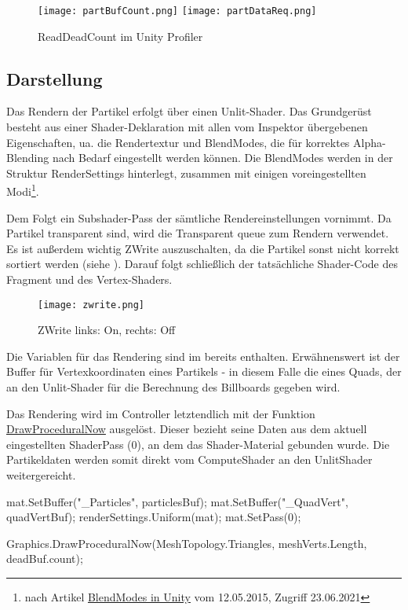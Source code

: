 \begin{figure}[H]
\centering
\texttt{[image: partBufCount.png]}
\texttt{[image: partDataReq.png]}
\caption{ReadDeadCount im Unity Profiler}
\end{figure}
    

\subsection{Darstellung}

Das Rendern der Partikel erfolgt über einen Unlit-Shader. Das Grundgerüst besteht aus einer Shader-Deklaration mit allen vom Inspektor übergebenen Eigenschaften, ua. die Rendertextur und BlendModes, die für korrektes Alpha-Blending nach Bedarf eingestellt werden können. Die BlendModes werden in der Struktur RenderSettings hinterlegt, zusammen mit einigen voreingestellten Modi\footnote{nach Artikel \href{https://elringus.me/blend-modes-in-unity}{BlendModes in Unity} vom 12.05.2015, Zugriff 23.06.2021}.

Dem Folgt ein Subshader-Pass der sämtliche Rendereinstellungen vornimmt. Da Partikel transparent sind, wird die Transparent queue zum Rendern verwendet. Es ist au{\ss}erdem wichtig ZWrite auszuschalten, da die Partikel sonst nicht korrekt sortiert werden (siehe ). Darauf folgt schlie{\ss}lich der tatsächliche Shader-Code des Fragment und des Vertex-Shaders.

\begin{figure}[H]
\centering
\texttt{[image: zwrite.png]}
\caption{ZWrite links: On, rechts: Off}
\label{img:zoff}
\end{figure}


Die Variablen für das Rendering sind im  bereits enthalten. Erwähnenswert ist der Buffer für Vertexkoordinaten eines Partikels - in diesem Falle die eines Quads, der an den Unlit-Shader für die Berechnung des Billboards gegeben wird.

Das Rendering wird im Controller letztendlich mit der Funktion \href{https://docs.unity3d.com/ScriptReference/Graphics.DrawProceduralNow.html}{DrawProceduralNow} ausgelöst. Dieser bezieht seine Daten aus dem aktuell eingestellten ShaderPass (0), an dem das Shader-Material gebunden wurde. Die Partikeldaten werden somit direkt vom ComputeShader an den UnlitShader weitergereicht.

\begin{csh}[caption=Partikel Rendering]
mat.SetBuffer("_Particles", particlesBuf);
mat.SetBuffer("_QuadVert", quadVertBuf);
renderSettings.Uniform(mat);
mat.SetPass(0);

Graphics.DrawProceduralNow(MeshTopology.Triangles, meshVerts.Length, deadBuf.count);
\end{csh}

